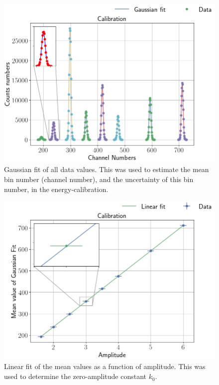 

\begin{figure}[h]
\centering
\includegraphics[width=0.99\columnwidth]{gaussian_fit}
\caption{Gaussian fit of all data values. This was used to estimate the mean
bin number (channel number), and the uncertainty of this bin number, in the
energy-calibration.}
\label{fig_gaussian_fit}
\end{figure}

\begin{figure}[h]
\centering
\includegraphics[width=0.99\columnwidth]{k0_plotting}
\caption{Linear fit of the mean values as a function of amplitude. This was
used to determine the zero-amplitude constant $k_0$.}
\label{fig_linear_fit}
\end{figure}


